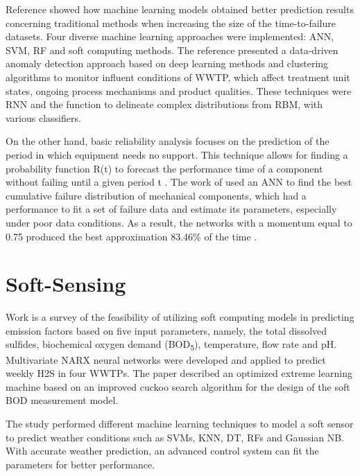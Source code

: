  Reference \cite{Alsina2018} showed how machine learning models obtained better prediction results concerning traditional methods when increasing the size of the time-to-failure datasets. Four diverse machine learning approaches were implemented: \ac{ANN}, \ac{SVM}, \ac{RF} and soft computing methods. The reference \cite{Dairi2019} presented a data-driven anomaly detection approach based on deep learning methods and clustering algorithms to monitor influent conditions of \ac{WWTP}, which affect treatment unit states, ongoing process mechanisms and product qualities. These techniques were \ac{RNN} and the function to delineate complex distributions from \ac{RBM}, with various classifiers.
 
 On the other hand, basic reliability analysis focuses on the prediction of the period in which equipment needs no support. This technique allows for finding a probability function R(t) to forecast the performance time of a component without failing until a given period t \cite{Alsina2018}. The work of \cite{Alsina2016} used an \ac{ANN} to find the best cumulative failure distribution of mechanical components, which had a performance to fit a set of failure data and estimate its parameters, especially under poor data conditions. As a result, the networks with a momentum equal to 0.75 produced the best approximation 83.46\% of the time \cite{Alsina2016}.


\section{Soft-Sensing}
\label{s:Related-Works-SoftSensing}

Work \cite{Zounemat-Kermani2019} is a survey of the feasibility of utilizing soft computing models in predicting emission factors based on five input parameters, namely, the total dissolved sulfides, biochemical oxygen demand (\ac{BOD}\textsubscript{5}), temperature, flow rate and pH. Multivariate \ac{NARX} neural networks were developed and applied to predict weekly H2S in four \ac{WWTP}s. The paper \cite{Yu2019} described an optimized extreme learning machine based on an improved cuckoo search algorithm for the design of the soft \ac{BOD} measurement model.

The study \cite{Hernandez-del-Olmo2019} performed different machine learning techniques to model a soft sensor to predict weather conditions such as \ac{SVM}s, \ac{KNN}, \ac{DT}, \ac{RF}s and Gaussian \ac{NB}. With accurate weather prediction, an advanced control system can fit the parameters for better performance.

